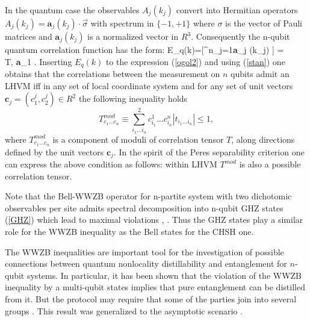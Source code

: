 \documentclass[rmp,12pt,preprint]{revtex4-2}
\begin{document}
In the quantum case the observables $A_j(k_j)$ convert into Hermitian
operators $A_j(k_j)=\textbf{a}_j(k_j)\cdot \vec {\sigma} $ with
spectrum in $\{-1,+1\}$ where $\sigma $ is the vector of Pauli
matrices and $\textbf{a}_j(k_j)$ is a normalized vector in $R^3$.
Consequently the n-qubit quantum correlation function has the form:
\ben 
E_q(k)={\tr}[\rho \otimes ^n_{j=1}\textbf{a}_j (k_j)\cdot\vec
{\sigma}] = \nonumber \\ 
\<T, \textbf{a}_1\otimes \cdots\otimes{} \>. \label{eq} 
\een 
Inserting $E_q(k)$ to the expression
(\ref{ogol2}) and using (\ref{stan}) one obtains that the correlations
between the measurement on $n$ qubits admit an LHVM iff in any set of
local coordinate system and for any set of unit vectors $\textbf{c}_j=
(c^j_1,c^j_2)\in R^2$ the following inequality holds \cite{ZB}
\begin{equation}
T^{mod}_{c_1...c_n}\equiv
\sum^2_{i_1...i_n}{c^1_{i_1}...c^n_{i_n}}|t_{{i_1}...{i_n}}|\leq  1,
\label{war}
\end{equation}
where $T^{mod}_{c_1...c_n}$ is a component of moduli of correlation
tensor $T$, along directions defined by the unit vectors
$\textbf{c}_j$. In the spirit of the Peres separability criterion one
can express the above condition as follows: within LHVM $T^{mod} $ is
also a possible correlation tensor.

Note that the Bell-WWZB operator for n-partite system with two
dichotomic observables per site admits spectral decomposition into
n-qubit GHZ states (\ref {GHZ}) which lead to maximal violations \cite
{Scarani}, \cite {WW}. Thus the GHZ states play a similar role for the
WWZB inequality as the Bell states for the CHSH one.

The WWZB inequalities are important tool for the investigation of
possible connections between quantum nonlocality distillability and
entanglement for $n$-qubit systems. In particular, it has been shown
that the violation of the WWZB inequality by a multi-qubit states
implies that pure entanglement can be distilled from it. But the
protocol may require that some of the parties join into several groups
\cite {Acin1,ASW}. This result was generalized to the asymptotic
scenario \cite {Masanes}.
\end{document}
